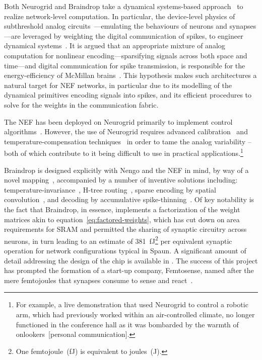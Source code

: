 Both Neurogrid and Braindrop take a dynamical systems-based approach~\citep{arthur2011silicon, gao2012dynamical} to realize network-level computation.
In particular, the device-level physics of subthreshold analog circuits~\citep{andreou1991current}---emulating the behaviours of neurons and synapses---are leveraged by weighting the digital communication of spikes, to engineer dynamical systems~\citep{dethier2011brain}.
It is argued that an appropriate mixture of analog computation for nonlinear encoding---sparsifying signals across both space and time---and digital communication for spike transmission, is responsible for the energy-efficiency of McMillan brains~\citep{boahen2017neuromorph}.
This hypothesis makes such architectures a natural target for NEF networks, in particular due to its modelling of the dynamical primitives encoding signals into spikes, and its efficient procedures to solve for the weights in the communication fabric.

The NEF has been deployed on Neurogrid primarily to implement control algorithms~\citep{dethier2011brain, choudhary2012silicon, menon2014controlling}.
However, the use of Neurogrid requires advanced calibration~\citep{kauderer2017calibrating} and temperature-compensation techniques~\citep{abrams2017} in order to tame the analog variability -- both of which contribute to it being difficult to use in practical applications.\footnote{
For example, a live demonstration that used Neurogrid to control a robotic arm, which had previously worked within an air-controlled climate, no longer functioned in the conference hall as it was bombarded by the warmth of onlookers~[personal communication].}

Braindrop is designed explicitly with Nengo and the NEF in mind, by way of a novel mapping~\citep{voelker2017iscas, neckar2018optimizing}, accompanied by a number of inventive solutions including: temperature-invariance~\citep{abrams2017, reidpint2019, benjamintemp2019}, H-tree routing~\citep{fokserial2018}, sparse encoding by spatial convolution~\citep{feinstein1988hexagonal, braindrop2019}, and decoding by accumulative spike-thinning~\citep{fokthinning2019}.
Of key notability is the fact that Braindrop, in essence, implements a factorization of the weight matrices akin to equation~\ref{eq:factored-weights}, which has cut down on area requirements for SRAM and permitted the sharing of synaptic circuitry across neurons, in turn leading to an estimate of 381~fJ\footnote{
One femtojoule~(fJ) is equivalent to  joules~(J).}
per equivalent synaptic operation for network configurations typical in Spaun.
A significant amount of detail addressing the design of the chip is available in \citet{neckar2018braindrop, fok2018communicating, braindrop2019}.
The success of this project has prompted the formation of a start-up company, Femtosense, named after the mere femtojoules that synapses consume to sense and react~\citep{femtosense}. 

